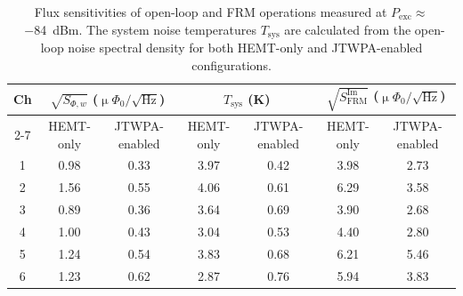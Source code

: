 \documentclass[
 prd,
 reprint,
 superscriptaddress,
 amsmath,amssymb,
 aps,
 floatfix,
]{revtex4-2}
\newcommand{\uPhirtHz}{$\upmu \Phi_0/\sqrt{\text{Hz}}$\xspace}
\begin{document}
\begin{table}[htb]
    \centering
    \begin{tabular}{c cc cc cc}
    \hline
    \multirow{2}{*}{Ch} & \multicolumn{2}{c}{$\sqrt{S_{\Phi,w}}$ (\uPhirtHz)} & \multicolumn{2}{c}{$T_{\text{sys}}$ (K)} & \multicolumn{2}{c}{$\sqrt{S^{\text{Im}}_{\text{FRM}}}$ (\uPhirtHz)} \\
    \cline{2-7}
    & HEMT-only & JTWPA-enabled & HEMT-only & JTWPA-enabled & HEMT-only & JTWPA-enabled \\
    \hline
    1 & 0.98 & 0.33 & 3.97 & 0.42 & 3.98 & 2.73 \\
    2 & 1.56 & 0.55 & 4.06 & 0.61 & 6.29 & 3.58 \\
    3 & 0.89 & 0.36 & 3.64 & 0.69 & 3.90 & 2.68 \\
    4 & 1.00 & 0.43 & 3.04 & 0.53 & 4.40 & 2.80 \\
    5 & 1.24 & 0.54 & 3.83 & 0.68 & 6.21 & 5.46 \\
    6 & 1.23 & 0.62 & 2.87 & 0.76 & 5.94 & 3.83 \\
    \hline
    \end{tabular}
    \caption{Flux sensitivities of open-loop and FRM operations measured at \mbox{$P_{\text{exc}}\approx$~\qty{-84}{dBm}}. The system noise temperatures $T_{\text{sys}}$ are calculated from the open-loop noise spectral density for both HEMT-only and JTWPA-enabled configurations.}
    \label{tab:TWPA_noise}
\end{table}
\end{document}
